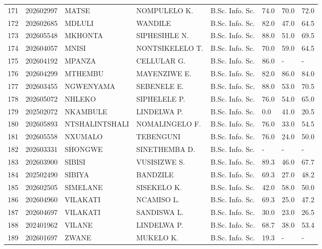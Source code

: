 \documentclass[12pt]{article}
\begin{document}
\begin{longtable}{@{}llllllll@{}}
171 & 202602997 & MATSE & NOMPULELO K. & B.Sc. Info. Sc. & 74.0 & 70.0 & 72.0 \\
172 & 202602685 & MDLULI & WANDILE & B.Sc. Info. Sc. & 82.0 & 47.0 & 64.5 \\
173 & 202605548 & MKHONTA & SIPHESIHLE N. & B.Sc. Info. Sc. & 88.0 & 51.0 & 69.5 \\
174 & 202604057 & MNISI & NONTSIKELELO T. & B.Sc. Info. Sc. & 70.0 & 59.0 & 64.5 \\
175 & 202604192 & MPANZA & CELLULAR G. & B.Sc. Info. Sc. & 86.0 & - & - \\
176 & 202604299 & MTHEMBU & MAYENZIWE E. & B.Sc. Info. Sc. & 82.0 & 86.0 & 84.0 \\
177 & 202603455 & NGWENYAMA & SEBENELE E. & B.Sc. Info. Sc. & 88.0 & 53.0 & 70.5 \\
178 & 202605072 & NHLEKO & SIPHELELE P. & B.Sc. Info. Sc. & 76.0 & 54.0 & 65.0 \\
179 & 202502072 & NKAMBULE & LINDELWA P. & B.Sc. Info. Sc. & 0.0 & 41.0 & 20.5 \\
180 & 202605893 & NTSHALINTSHALI & NOMALINGELO F. & B.Sc. Info. Sc. & 76.0 & 33.0 & 54.5 \\
181 & 202605558 & NXUMALO & TEBENGUNI & B.Sc. Info. Sc. & 76.0 & 24.0 & 50.0 \\
182 & 202603331 & SHONGWE & SINETHEMBA D. & B.Sc. Info. Sc. & - & - & - \\
183 & 202603900 & SIBISI & VUSISIZWE S. & B.Sc. Info. Sc. & 89.3 & 46.0 & 67.7 \\
184 & 202502490 & SIBIYA & BANDZILE & B.Sc. Info. Sc. & 69.3 & 27.0 & 48.2 \\
185 & 202602505 & SIMELANE & SISEKELO K. & B.Sc. Info. Sc. & 42.0 & 58.0 & 50.0 \\
186 & 202604960 & VILAKATI & NCAMISO L. & B.Sc. Info. Sc. & 69.3 & 25.0 & 47.2 \\
187 & 202604697 & VILAKATI & SANDISWA L. & B.Sc. Info. Sc. & 30.0 & 23.0 & 26.5 \\
188 & 202401962 & VILANE & LINDELWA P. & B.Sc. Info. Sc. & 68.7 & 38.0 & 53.4 \\
189 & 202601697 & ZWANE & MUKELO K. & B.Sc. Info. Sc. & 19.3 & - & - \\


\end{longtable}
\end{document}
